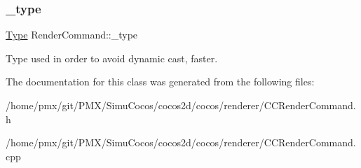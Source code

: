 \subsubsection{\texorpdfstring{\+\_\+type}{\_type}}
{\footnotesize\ttfamily \hyperlink{classRenderCommand_a17af6f8ac8e8a22a9007287a70ae5d1e}{Type} Render\+Command\+::\+\_\+type\hspace{0.3cm}{\ttfamily [protected]}}

Type used in order to avoid dynamic cast, faster. 

The documentation for this class was generated from the following files\+:\begin{DoxyCompactItemize}
\item 
/home/pmx/git/\+P\+M\+X/\+Simu\+Cocos/cocos2d/cocos/renderer/C\+C\+Render\+Command.\+h\item 
/home/pmx/git/\+P\+M\+X/\+Simu\+Cocos/cocos2d/cocos/renderer/C\+C\+Render\+Command.\+cpp\end{DoxyCompactItemize}

